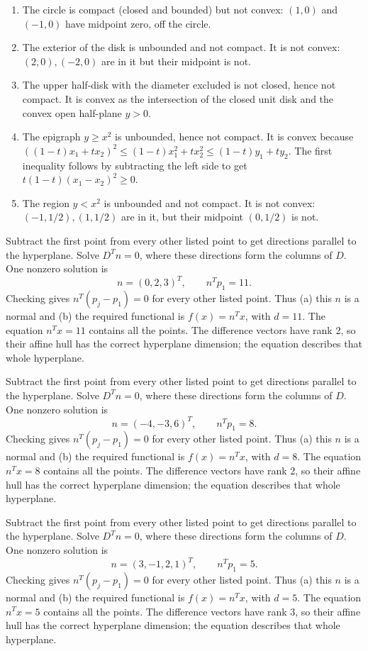 \begin{enumerate}[label=(\alph*)]
\item The circle is compact (closed and bounded) but not convex:
$(1,0)$ and $(-1,0)$ have midpoint zero, off the circle.
\item The exterior of the disk is unbounded and not compact. It is
not convex: $(2,0),(-2,0)$ are in it but their midpoint is not.
\item The upper half-disk with the diameter excluded is not closed,
hence not compact. It is convex as the intersection of the closed unit disk
and the convex open half-plane $y>0$.
\item The epigraph $y\ge x^2$ is unbounded, hence not compact.
It is convex because
$((1-t)x_1+tx_2)^2\le(1-t)x_1^2+tx_2^2\le(1-t)y_1+ty_2$.
The first inequality follows by subtracting the left side to get
$t(1-t)(x_1-x_2)^2\ge0$.
\item The region $y<x^2$ is unbounded and not compact. It is not convex:
$(-1,1/2),(1,1/2)$ are in it, but their midpoint $(0,1/2)$ is not.
\end{enumerate}

Subtract the first point from every other listed point to get directions parallel to the hyperplane. Solve $D^Tn=0$, where these directions form the columns of $D$. One nonzero solution is
\[ n=(0,2,3)^T,\qquad n^Tp_1=11.\]
Checking gives $n^T(p_j-p_1)=0$ for every other listed point. Thus (a) this $n$ is a normal and (b) the required functional is $f(x)=n^Tx$, with $d=11$. The equation $n^Tx=11$ contains all the points. The difference vectors have rank 2, so their affine hull has the correct hyperplane dimension; the equation describes that whole hyperplane.

Subtract the first point from every other listed point to get directions parallel to the hyperplane. Solve $D^Tn=0$, where these directions form the columns of $D$. One nonzero solution is
\[ n=(-4,-3,6)^T,\qquad n^Tp_1=8.\]
Checking gives $n^T(p_j-p_1)=0$ for every other listed point. Thus (a) this $n$ is a normal and (b) the required functional is $f(x)=n^Tx$, with $d=8$. The equation $n^Tx=8$ contains all the points. The difference vectors have rank 2, so their affine hull has the correct hyperplane dimension; the equation describes that whole hyperplane.

Subtract the first point from every other listed point to get directions parallel to the hyperplane. Solve $D^Tn=0$, where these directions form the columns of $D$. One nonzero solution is
\[ n=(3,-1,2,1)^T,\qquad n^Tp_1=5.\]
Checking gives $n^T(p_j-p_1)=0$ for every other listed point. Thus (a) this $n$ is a normal and (b) the required functional is $f(x)=n^Tx$, with $d=5$. The equation $n^Tx=5$ contains all the points. The difference vectors have rank 3, so their affine hull has the correct hyperplane dimension; the equation describes that whole hyperplane.

